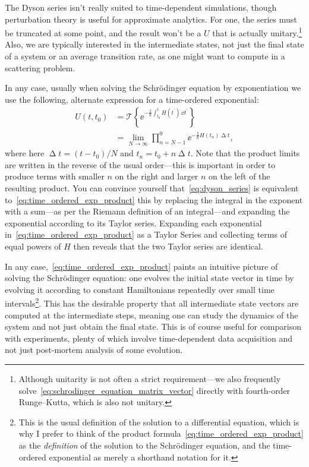 The Dyson series isn't really suited to time-dependent simulations, though perturbation theory is useful for approximate analytics. For one, the series must be truncated at some point, and the result won't be a $U$ that is actually unitary.\footnote{Although unitarity is not often a strict requirement---we also frequently solve~\eqref{eq:schrodinger_equation_matrix_vector} directly with fourth-order Runge--Kutta, which is also not unitary.} Also, we are typically interested in the intermediate states, not just the final state of a system or an average transition rate, as one might want to compute in a scattering problem.

In any case, usually when solving the Schr\"odinger equation by exponentiation we use the following, alternate expression for a time-ordered exponential:
\begin{align}
U(t, t_0) &= \mathcal{T}\left\{\ee^{-\frac \ii \hbar \int_{t_0}^t H(t^\prime)\,\dd t^\prime}\right\}\\
 &= \lim_{N\rightarrow\infty}\prod_{n=N-1}^0 \ee^{-\frac \ii \hbar  H(t_n)\upDelta t},
\label{eq:time_ordered_exp_product}
\end{align}
where here $\upDelta t = (t - t_0)/N$ and $t_n = t_0 + n\upDelta t$. Note that the product limits are written in the reverse of the usual order---this is important in order to produce terms with smaller $n$ on the right and larger $n$ on the left of the resulting product. You can convince yourself that~\eqref{eq:dyson_series} is equivalent to~\eqref{eq:time_ordered_exp_product} this by replacing the integral in the exponent with a sum---as per the Riemann definition of an integral---and expanding the exponential according to its Taylor series. Expanding each exponential in~\eqref{eq:time_ordered_exp_product} as a Taylor Series and collecting terms of equal powers of $H$ then reveals that the two Taylor series are identical.

In any case,~\eqref{eq:time_ordered_exp_product} paints an intuitive picture of solving the Schr\"odinger equation: one evolves the initial state vector in time by evolving it according to constant Hamiltonians repeatedly over small time intervals\footnote{This is the usual definition of the solution to a differential equation, which is why I prefer to think of the product formula~\eqref{eq:time_ordered_exp_product} as the \emph{definition} of the solution to the Schr\"odinger equation, and the time-ordered exponential as merely a shorthand notation for it.}. This has the desirable property that all intermediate state vectors are computed at the intermediate steps, meaning one can study the dynamics of the system and not just obtain the final state. This is of course useful for comparison with experiments, plenty of which involve time-dependent data acquisition and not just post-mortem analysis of some evolution.

